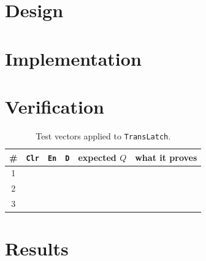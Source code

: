 
\section{Design}

\section{Implementation}



\section{Verification}

\begin{table}[htbp]
\centering
\caption{Test vectors applied to \texttt{TransLatch}.}
\label{tab:lab01-vectors}
\begin{tabular}{clllll}
\toprule
\# & \texttt{Clr} & \texttt{En} & \texttt{D} & expected $Q$ & what it proves \\
\midrule
1 &   &   &   &   & \\
2 &   &   &   &   & \\
3 &   &   &   &   & \\
\bottomrule
\end{tabular}
\end{table}


\section{Results}

